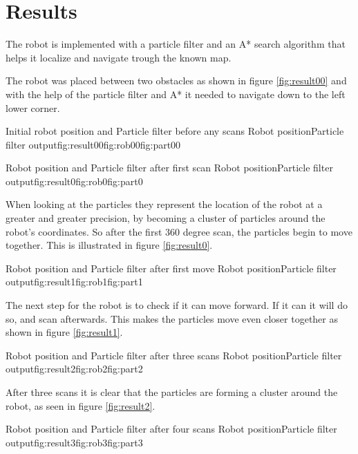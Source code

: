 \chapter{Results}
\label{chp:resul}

The robot is implemented with a particle filter and an A* search algorithm that helps it localize and navigate trough the known map. 


The robot was placed between two obstacles as shown in figure \ref{fig:result00} and with the help of the particle filter and A* it needed to navigate down to the left lower corner. 

{Initial robot position and Particle filter before any scans}
{Robot position}{Particle filter output}{fig:result00}{fig:rob00}{fig:part00}


{Robot position and Particle filter after first scan}
{Robot position}{Particle filter output}{fig:result0}{fig:rob0}{fig:part0}

\FloatBarrier
When looking at the particles they represent the location of the robot at a greater and greater precision, by becoming a cluster of particles around the robot's coordinates. So after the first 360 degree scan, the particles begin to move together. This is illustrated in figure \ref{fig:result0}.


{Robot position and Particle filter after first move}
{Robot position}{Particle filter output}{fig:result1}{fig:rob1}{fig:part1}

The next step for the robot is to check if it can move forward. If it can it will do so, and scan afterwards. This makes the particles move even closer together as shown in figure \ref{fig:result1}.


{Robot position and Particle filter after three scans}
{Robot position}{Particle filter output}{fig:result2}{fig:rob2}{fig:part2}

\FloatBarrier
After three scans it is clear that the particles are forming a cluster around the robot, as seen in figure \ref{fig:result2}. 


{Robot position and Particle filter after four scans}
{Robot position}{Particle filter output}{fig:result3}{fig:rob3}{fig:part3}

